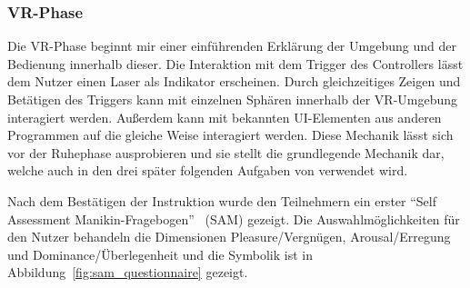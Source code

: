 \subsubsection{VR-Phase}

Die VR-Phase beginnt mir einer einführenden Erklärung der Umgebung und der Bedienung innerhalb dieser. Die Interaktion mit dem Trigger des Controllers lässt dem Nutzer einen Laser als Indikator erscheinen. 
Durch gleichzeitiges Zeigen und Betätigen des Triggers kann mit einzelnen Sphären innerhalb der VR-Umgebung interagiert werden.
Außerdem kann mit bekannten UI-Elementen aus anderen Programmen auf die gleiche Weise interagiert werden.
Diese Mechanik lässt sich vor der Ruhephase ausprobieren und sie stellt die grundlegende Mechanik dar, welche auch in den drei später folgenden Aufgaben von verwendet wird.

Nach dem Bestätigen der Instruktion wurde den Teilnehmern ein erster "`Self Assessment Manikin-Fragebogen"'~\cite{bradley1994measuring} (SAM) gezeigt. Die Auswahlmöglichkeiten für den Nutzer behandeln die Dimensionen Pleasure/Vergnügen, Arousal/Erregung und Dominance/Überlegenheit und die Symbolik ist in Abbildung~\ref{fig:sam_questionnaire} gezeigt.


